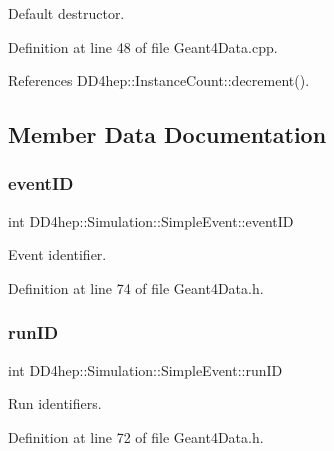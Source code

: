 Default destructor. 



Definition at line 48 of file Geant4\+Data.\+cpp.



References D\+D4hep\+::\+Instance\+Count\+::decrement().



\subsection{Member Data Documentation}
\hypertarget{class_d_d4hep_1_1_simulation_1_1_simple_event_a6c196367ec2be5a8cad2afe89d038a6d}{}\label{class_d_d4hep_1_1_simulation_1_1_simple_event_a6c196367ec2be5a8cad2afe89d038a6d} 
\subsubsection{\texorpdfstring{event\+ID}{eventID}}
{\footnotesize\ttfamily int D\+D4hep\+::\+Simulation\+::\+Simple\+Event\+::event\+ID}



Event identifier. 



Definition at line 74 of file Geant4\+Data.\+h.

\hypertarget{class_d_d4hep_1_1_simulation_1_1_simple_event_a128035e74755e19ac0fc4526e959a96c}{}\label{class_d_d4hep_1_1_simulation_1_1_simple_event_a128035e74755e19ac0fc4526e959a96c} 
\subsubsection{\texorpdfstring{run\+ID}{runID}}
{\footnotesize\ttfamily int D\+D4hep\+::\+Simulation\+::\+Simple\+Event\+::run\+ID}



Run identifiers. 



Definition at line 72 of file Geant4\+Data.\+h.

\hypertarget{class_d_d4hep_1_1_simulation_1_1_simple_event_a6284fef7dbe512536fad17533444e325}{}\label{class_d_d4hep_1_1_simulation_1_1_simple_event_a6284fef7dbe512536fad17533444e325} 

